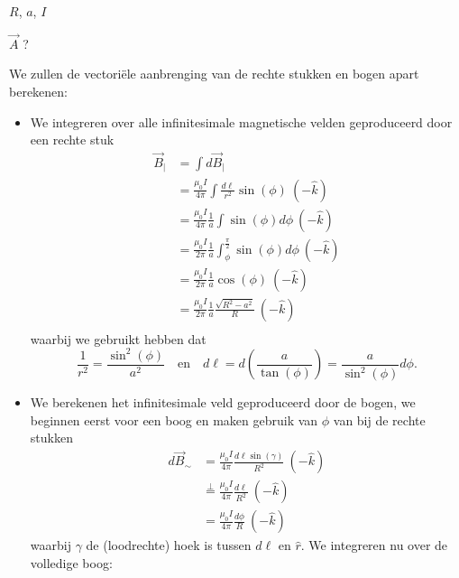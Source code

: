 \begin{description}[labelwidth=1.5cm, leftmargin=!]
    \item[Geg. :]   $R$, $a$, $I$
    \item[Gevr. :]  $\Vec{A}$ ?
    \item[Opl. :]  
    We zullen de vectoriële aanbrenging van de rechte stukken en bogen apart berekenen:
    \begin{itemize}
        \item 
            We integreren over alle infinitesimale magnetische velden geproduceerd door een rechte stuk 
            \begin{align*}
                \vec{B}_{|} 
                    &= \int d\Vec{B}_{|} \\
                    &= \frac{\mu_0I}{4\pi}\int\frac{d\ell}{r^2} \sin(\phi) \ (-\hat{k}) \\
                    &= \frac{\mu_0I}{4\pi}\frac{1}{a} \int \sin(\phi) d\phi  \ (-\hat{k}) \\
                    &= \frac{\mu_0I}{2\pi}\frac{1}{a} \int_{\phi}^{\frac{\pi}{2}} \sin(\phi) d\phi  \ (-\hat{k}) \\
                    &= \frac{\mu_0I}{2\pi}\frac{1}{a} \cos(\phi) \ (-\hat{k}) \\
                    &= \frac{\mu_0I}{2\pi}\frac{1}{a} \frac{\sqrt{R^2-a^2}}{R} \ (-\hat{k}) \\
            \end{align*}
            waarbij we gebruikt hebben dat
            \begin{equation*}
                \frac{1}{r^2} = \frac{\sin^2(\phi)}{a^2}  \quad \text{en} \quad d\ell = d\left(\frac{a}{\tan(\phi)}\right) = \frac{a}{\sin^2(\phi)}d\phi.       
            \end{equation*}
        \item 
            We berekenen het infinitesimale veld geproduceerd door de bogen, we beginnen eerst voor een boog en maken gebruik van $\phi$ van bij de rechte stukken
            \begin{align*}
                d\Vec{B}_{\sim} 
                    &= \frac{\mu_0I}{4\pi}\frac{d\ell \sin(\gamma)}{R^2} \ (-\hat{k}) \\
                    &\overset{\perp}{=} \frac{\mu_0I}{4\pi}\frac{d\ell}{R^2} \ (-\hat{k}) \\
                    &= \frac{\mu_0I}{4\pi}\frac{d\phi}{R} \ (-\hat{k}) 
            \end{align*}
            waarbij $\gamma$ de (loodrechte) hoek is tussen $d\ell$ en $\hat{r}$. We integreren nu over de volledige boog:

\end{itemize}
\end{description}
